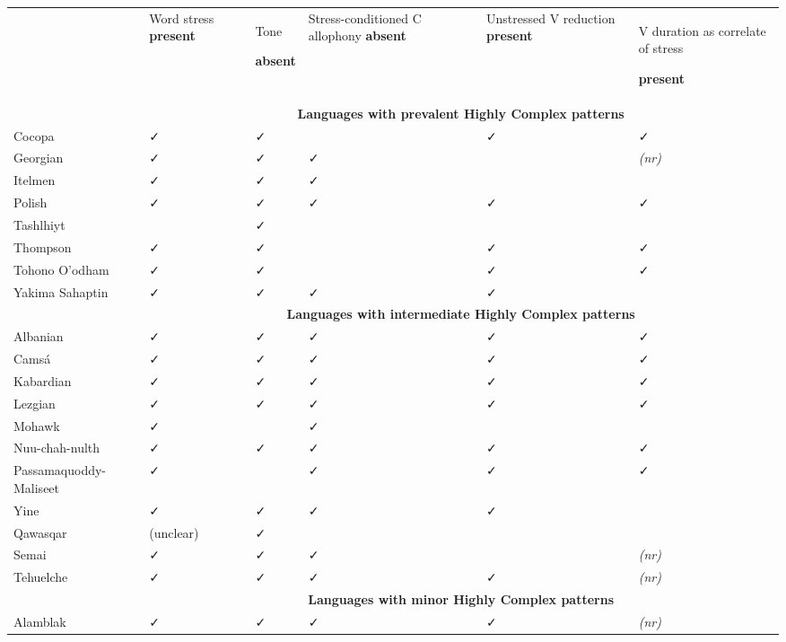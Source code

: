 \begin{table}
\begin{tabularx}{\textwidth}{XXXXXX}
\lsptoprule
 & Word stress \textbf{present} & { Tone} 

 \textbf{absent} & Stress-conditioned C allophony \textbf{absent} & Unstressed V reduction \textbf{present} & { V duration  as correlate of stress} 

 \textbf{present}\\
& \multicolumn{5}{c}{ \textbf{Languages with prevalent Highly Complex patterns}}\\
\hhline{~-----}
 Cocopa & ✓ & ✓ &  & ✓ & ✓\\
\hhline{~-----}
 Georgian & ✓ & ✓ & { ✓} &  & \textit{(nr)}\\
\hhline{~-----}
 Itelmen & ✓ & ✓ & { ✓} &  & \\
\hhline{~-----}
 Polish & ✓ & ✓ & ✓ & ✓ & ✓\\
\hhline{~-----}
 Tashlhiyt &  & ✓ & {} &  & \\
\hhline{~-----}
 Thompson & ✓ & ✓ & {} & ✓ & ✓\\
\hhline{~-----}
 Tohono O’odham & ✓ & ✓ & {} & ✓ & ✓\\
\hhline{~-----}
 Yakima Sahaptin & ✓ & ✓ & ✓ & ✓ & \\
& \multicolumn{5}{c}{ \textbf{Languages with intermediate Highly Complex patterns}}\\
\hhline{~-----}
 Albanian & ✓ & ✓ & ✓ & ✓ & ✓\\
\hhline{~-----}
 Camsá & ✓ & ✓ & ✓ & ✓ & ✓\\
\hhline{~-----}
 Kabardian & ✓ & ✓ & ✓ & ✓ & ✓\\
\hhline{~-----}
 Lezgian & ✓ & ✓ & ✓ & ✓ & ✓\\
\hhline{~-----}
 Mohawk & ✓ &  & ✓ &  & \\
\hhline{~-----}
 Nuu-chah-nulth & ✓ & ✓ & ✓ & ✓ & ✓\\
\hhline{~-----}
 Passamaquoddy-Maliseet & ✓ &  & ✓ & ✓ & ✓\\
\hhline{~-----}
 Yine & ✓ & ✓ & ✓ & ✓ & \\
\hhline{~-----}
 Qawasqar & (unclear) & ✓ &  &  & \\
\hhline{~-----}
 Semai & ✓ & ✓ & ✓ &  & \textit{(nr)}\\
\hhline{~-----}
 Tehuelche & ✓ & ✓ & ✓ & ✓ & \textit{(nr)}\\
& \multicolumn{5}{c}{ \textbf{Languages with minor Highly Complex patterns}}\\
\hhline{~-----}
 Alamblak & ✓ & ✓ & ✓ & ✓ & \textit{(nr)}\\

\end{tabularx}
\end{table}
